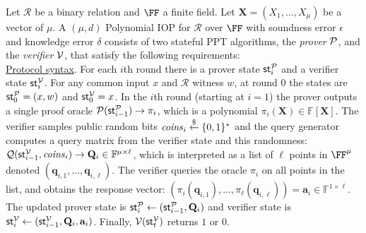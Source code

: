 \begin{definition} 
Let $\mathcal{R}$ be a binary relation and $\FF$ a finite field. Let $\mathbf{X} = (X_1, \ldots, X_\mu)$ be a vector of $\mu$. A $(\mu, d)$ Polynomial IOP for $\mathcal{R}$ over $\FF$ with soundness error $\epsilon$ and knowledge error $\delta$ consists of two stateful PPT algorithms, the \emph{prover} $\mathcal{P}$, and the \emph{verifier} $\mathcal{V}$, that satisfy the following requirements:\\

\noindent \underline{Protocol syntax}. 
For each $i$th round there is a prover state $\textsf{st}^\mathcal{P}_i$ and a verifier state $\textsf{st}^\mathcal{V}_i$. For any common input $x$ and $\mathcal{R}$ witness $w$, at round 0 the states are $\textsf{st}^\mathcal{P}_0 = (x, w)$ and $\textsf{st}^\mathcal{V}_0 = x$. 
In the $i$th round (starting at $i = 1$) the prover outputs a single proof oracle $\mathcal{P}(\textsf{st}^\mathcal{P}_{i-1}) \rightarrow \pi_i$, which is a polynomial $\pi_i(\mathbf{X}) \in \mathbb{F}[\mathbf{X}]$. 
The verifier samples public random bits $\mathit{coins}_i \overset{\$}{\gets} \{0,1\}^*$ and the query generator computes a query matrix from the verifier state and this randomness: $\mathcal{Q}(\textsf{st}^\mathcal{V}_{i-1}, \mathit{coins}_i) \rightarrow \mathbf{Q}_i \in \mathbb{F}^{\mu \times \ell}$, which is interpreted as a list of $\ell$ points in $\FF^\mu$ denoted $(\mathbf{q}_{i,1},...,\mathbf{q}_{i,\ell})$. 
The verifier queries the oracle $\pi_i$ on all points in the list, 
and obtains the response vector: 
$(\pi_i(\mathbf{q}_{i,1}), \ldots, \pi_\ell(\mathbf{q}_{i, \ell})) = \mathbf{a}_i \in \mathbb{F}^{1 \times \ell}$. The updated prover state is $\textsf{st}^\mathcal{P}_i \leftarrow (\textsf{st}^\mathcal{P}_{i-1}, \mathbf{Q}_i)$
and verifier state is $\textsf{st}^\mathcal{V}_i \leftarrow (\textsf{st}^\mathcal{V}_{i-1}, \mathbf{Q}_i, \mathbf{a}_i)$. Finally, $\mathcal{V}(\textsf{st}^\mathcal{V}_t)$ returns $1$ or $0$. 


\end{definition}
